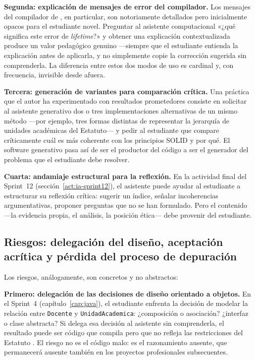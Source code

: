\textbf{Segunda: explicación de mensajes de error del compilador.}
Los mensajes del compilador de \rust, en particular, son notoriamente
detallados pero inicialmente opacos para el estudiante novel. Preguntar
al asistente computacional «¿qué significa este error de \textit{lifetime}?»
y obtener una explicación contextualizada produce un valor pedagógico genuino
---siempre que el estudiante entienda la explicación antes de aplicarla, y no
simplemente copie la corrección sugerida sin comprenderla. La diferencia entre
estos dos modos de uso es cardinal y, con frecuencia, invisible desde afuera.

\textbf{Tercera: generación de variantes para comparación crítica.}
Una práctica que el autor ha experimentado con resultados prometedores consiste
en solicitar al asistente generativo dos o tres implementaciones alternativas
de un mismo método ---por ejemplo, tres formas distintas de representar la jerarquía
de unidades académicas del Estatuto--- y pedir al estudiante que compare
críticamente cuál es más coherente con los principios SOLID y por qué. El
software generativo pasa así de ser el productor del código a ser el generador
del problema que el estudiante debe resolver.

\textbf{Cuarta: andamiaje estructural para la reflexión.}
En la actividad final del Sprint~12 (sección~\ref{act:ia-sprint12}), el asistente
puede ayudar al estudiante a estructurar su reflexión crítica: sugerir un índice,
señalar incoherencias argumentativas, proponer preguntas que no se han formulado.
Pero el contenido ---la evidencia propia, el análisis, la posición ética--- debe
provenir del estudiante.

\subsection{Riesgos: delegación del diseño, aceptación acrítica y pérdida del proceso de depuración}
\label{subsec:riesgos}

Los riesgos, análogamente, son concretos y no abstractos:

\textbf{Primero: delegación de las decisiones de diseño orientado a objetos.}
En el Sprint~4 (capítulo~\ref{cap:java}), el estudiante enfrenta la decisión
de modelar la relación entre \texttt{Docente} y \texttt{UnidadAcademica}: ¿composición
o asociación? ¿interfaz o clase abstracta? Si delega esa decisión al asistente
sin comprenderla, el resultado puede ser código que compila pero que no refleja
las restricciones del Estatuto \parencite{Martin2017}. El riesgo no es el código malo: es el razonamiento
ausente, que permanecerá ausente también en los proyectos profesionales subsecuentes.

